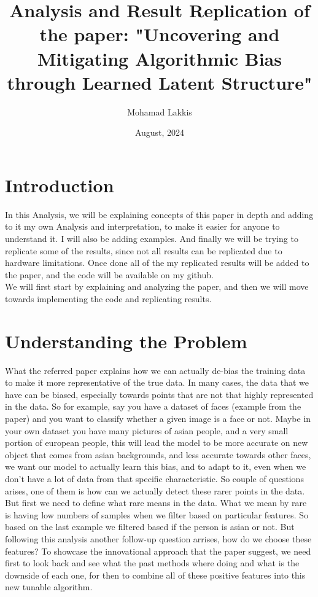 \documentclass{article}
\title{Analysis and Result Replication of the paper: "Uncovering and Mitigating Algorithmic Bias through Learned Latent Structure"}
\author{Mohamad Lakkis}
\date{August, 2024}
\begin{document}
\maketitle
\tableofcontents

      

\newpage




\section {Introduction}
In this Analysis, we will be explaining concepts of this paper in depth and adding to it my own Analysis and interpretation, to make it easier for anyone to understand it. 
I will also be adding examples. And finally we will be trying to replicate some of the results, since not all results can be replicated due to hardware limitations. Once done all of the
my replicated results will be added to the paper, and the code will be available on my github. \\ 
We will first start by explaining and analyzing the paper, and then we will move towards implementing the code and replicating results. 
\section {Understanding the Problem}

What the referred paper explains how we can actually de-bias the training data to make it more representative of the true data. In many cases, the data that we have can be biased, especially towards points that are not that highly represented in the data. So for example, say you have a dataset of faces (example from the paper) and you want to classify whether a given image is a face or not. Maybe in your own dataset you have many pictures of asian people, and a very small portion of european people, this will lead the model to be more accurate on new object that comes from asian backgrounds, and less accurate towards other faces, we want our model to actually learn this bias, and to adapt to it, even when we don't have a lot of data from that specific characteristic. So couple of questions arises, one of them is how can we actually detect these rarer points in the data. But first we need to define what rare means in the data. What we mean by rare is having low numbers of samples when we filter based on particular features. So based on the last example we filtered based if the person is asian or not. But following this analysis another follow-up question arrises, how do we choose these features? To showcase the innovational approach that the paper suggest, we need first to look back and see what the past methods where doing and what is the downside of each one, for then to combine all of these positive features into this new tunable algorithm. 
\end{document}
